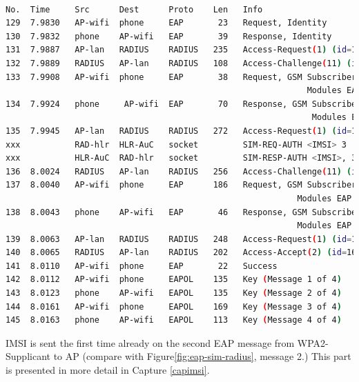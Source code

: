 \documentclass[12pt,a4paper,english]{tutthesis}
\begin{document}
\begin{otherlanguage}{english}

\begin{lstlisting}[language=bash,label=eap-sim-capture,caption={Successful EAP-SIM Authentication}]

No.  Time     Src      Dest      Proto    Len   Info                                  
129  7.9830   AP-wifi  phone     EAP       23   Request, Identity                     
130  7.9832   phone    AP-wifi   EAP       39   Response, Identity                    
131  7.9887   AP-lan   RADIUS    RADIUS   235   Access-Request(1) (id=162, l=193)     
132  7.9889   RADIUS   AP-lan    RADIUS   108   Access-Challenge(11) (id=162, l=66)   
133  7.9908   AP-wifi  phone     EAP       38   Request, GSM Subscriber Identity      
                                                             Modules EAP (EAP-SIM)                 
134  7.9924   phone     AP-wifi  EAP       70   Response, GSM Subscriber Identity     
                                                              Modules EAP (EAP-SIM)                 
135  7.9945   AP-lan   RADIUS    RADIUS   272   Access-Request(1) (id=163, l=230)     
xxx           RAD-hlr  HLR-AuC   socket         SIM-REQ-AUTH <IMSI> 3                 
xxx           HLR-AuC  RAD-hlr   socket         SIM-RESP-AUTH <IMSI>, 3 triplets      
136  8.0024   RADIUS   AP-lan    RADIUS   256   Access-Challenge(11) (id=163, l=214)  
137  8.0040   AP-wifi  phone     EAP      186   Request, GSM Subscriber Identity      
                                                           Modules EAP (EAP-SIM)                 
138  8.0043   phone    AP-wifi   EAP       46   Response, GSM Subscriber Identity     
                                                           Modules EAP (EAP-SIM)                 
139  8.0063   AP-lan   RADIUS    RADIUS   248   Access-Request(1) (id=164, l=206)     
140  8.0065   RADIUS   AP-lan    RADIUS   202   Access-Accept(2) (id=164, l=160)      
141  8.0110   AP-wifi  phone     EAP       22   Success                          
142  8.0112   AP-wifi  phone     EAPOL    135   Key (Message 1 of 4)                  
143  8.0123   phone    AP-wifi   EAPOL    135   Key (Message 2 of 4)                  
144  8.0161   AP-wifi  phone     EAPOL    169   Key (Message 3 of 4)                  
145  8.0163   phone    AP-wifi   EAPOL    113   Key (Message 4 of 4)     
\end{lstlisting}



IMSI is sent the first time already on the second EAP message from 
WPA2-Supplicant to AP (compare with Figure\ref{fig:eap-sim-radius}, message 2.)
This part is presented in more detail in Capture \ref{capimsi}.


\end{otherlanguage}
\end{document}
